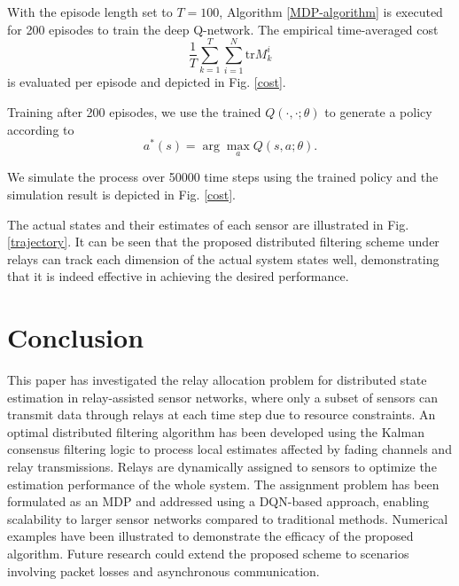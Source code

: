 \documentclass[twocolumn]{IEEEtran}
\begin{document}
With the episode length set to $T=100$, Algorithm \ref{MDP-algorithm} is executed for 200 episodes to train the deep Q-network. The empirical time-averaged cost
\begin{equation*}
    \frac{1}{T}\sum_{k=1}^T\sum_{i=1}^{N}\mathrm{tr}M^{i}_{k}
\end{equation*}
is evaluated per episode and depicted in Fig. \ref{cost}.

Training after 200 episodes, we use the trained $Q(\cdot,\cdot;\theta)$ to generate a policy according to
\begin{equation*}
    a^*(s) = \arg\max_{a} Q(s,a;\theta) \text{.}
\end{equation*}

We simulate the process over 50000 time steps using the trained policy and the simulation result is depicted in Fig. \ref{cost}.

The actual states and their estimates of each sensor are illustrated in Fig.\ref{trajectory}. It can be seen that the proposed distributed filtering scheme under relays can track each dimension of the actual system states well, demonstrating that it is indeed effective in achieving the desired performance.

\section{Conclusion} \label{sec:conclusion} 
This paper has investigated the relay allocation problem for distributed state estimation in relay-assisted sensor networks, where only a subset of sensors can transmit data through relays at each time step due to resource constraints. An optimal distributed filtering algorithm has been developed using the Kalman consensus filtering logic to process local estimates affected by fading channels and relay transmissions. Relays are dynamically assigned to sensors to optimize the estimation performance of the whole system. The assignment problem has been formulated as an MDP and addressed using a DQN-based approach, enabling scalability to larger sensor networks compared to traditional methods. Numerical examples have been illustrated to demonstrate the efficacy of the proposed algorithm. Future research could extend the proposed scheme to scenarios involving packet losses and asynchronous communication.
\end{document}
